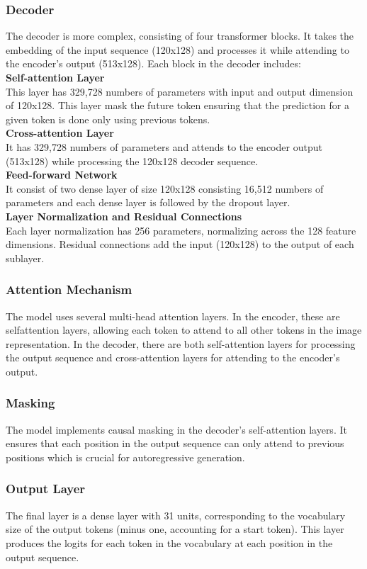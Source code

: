 \documentclass{ioereport}
\begin{document}
\subsubsection{Decoder}
The decoder is more complex, consisting of four transformer blocks. It takes the
embedding of the input sequence (120x128) and processes it while attending to the
encoder's output (513x128).
Each block in the decoder includes:\\
\textbf{Self-attention Layer}\\
This layer has 329,728 numbers of parameters with input and output dimension of
120x128. This layer mask the future token ensuring that the prediction for a given token
is done only using previous tokens.\\
\textbf{Cross-attention Layer}\\
It has 329,728 numbers of parameters and attends to the encoder output (513x128)
while processing the 120x128 decoder sequence.\\
\textbf{Feed-forward Network}\\
It consist of two dense layer of size 120x128 consisting 16,512 numbers of parameters
and each dense layer is followed by the dropout layer.\\
\textbf{Layer Normalization and Residual Connections}\\
Each layer normalization has 256 parameters, normalizing across the 128 feature
dimensions. Residual connections add the input (120x128) to the output of each sublayer.
\subsubsection{Attention Mechanism}
The model uses several multi-head attention layers. In the encoder, these are selfattention layers, allowing each token to attend to all other tokens in the image
representation. In the decoder, there are both self-attention layers for processing the
output sequence and cross-attention layers for attending to the encoder's output.
\subsubsection{Masking}
The model implements causal masking in the decoder's self-attention layers. It ensures
that each position in the output sequence can only attend to previous positions which is
crucial for autoregressive generation.
\subsubsection{Output Layer}
The final layer is a dense layer with 31 units, corresponding to the vocabulary size of
the output tokens (minus one, accounting for a start token). This layer produces the
logits for each token in the vocabulary at each position in the output sequence.
\end{document}
